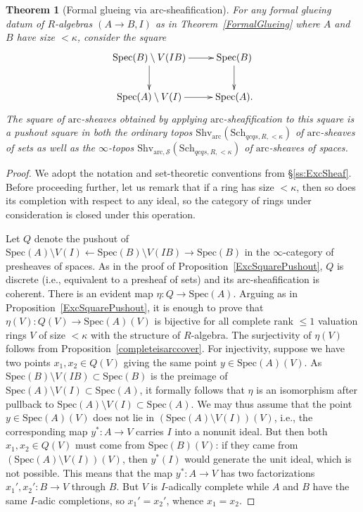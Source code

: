 \documentclass[reqno]{amsart}
\newcommand{\spec}{\mathrm{Spec}}
\newcommand{\arc}{\mathrm{arc}}
\newtheorem{theorem}{Theorem}[section]
\theoremstyle{definition}
\begin{document}
\begin{theorem}[Formal glueing via $\arc$-sheafification]
\label{FormalGlueArcSheaf}
For any formal glueing datum of $R$-algebras $(A \to B,I)$ as in Theorem~\ref{FormalGlueing} where $A$ and $B$ have size $< \kappa$, consider the square 
\[ \xymatrix{ \mathrm{Spec}(B) \setminus V(IB) \ar[r] \ar[d] & \mathrm{Spec}(B)
\ar[d] \\ \mathrm{Spec}(A) \setminus V(I) \ar[r] & \mathrm{Spec}(A). }\]
The square of $\arc$-sheaves obtained by applying $\arc$-sheafification to this
square is a pushout square in both the ordinary topos
$\mathrm{Shv}_{\arc}(\mathrm{Sch}_{qcqs,R, <\kappa})$ of $\arc$-sheaves of sets
as well as the $\infty$-topos
$\mathrm{Shv}_{\arc,\mathcal{S}}(\mathrm{Sch}_{qcqs,R, <\kappa})$ of $\arc$-sheaves of spaces.
\end{theorem}
\begin{proof}
We adopt the notation and set-theoretic conventions from \S \ref{ss:ExcSheaf}.  Before proceeding further, let us remark that if a ring has size $< \kappa$, then so does its completion with respect to any ideal, so the category of rings under consideration is closed under this operation.
 
Let $Q$ denote the pushout of $\spec(A) \setminus V(I) \gets \spec(B) \setminus
V(IB) \to \spec(B)$ in the $\infty$-category of presheaves of spaces. As in the
proof of Proposition~\ref{ExcSquarePushout}, $Q$ is discrete (i.e., equivalent
to a presheaf of sets) and its $\arc$-sheafification is coherent. There is an
evident map $\eta\colon Q \to \spec(A)$. Arguing as in
Proposition~\ref{ExcSquarePushout}, it is enough to prove that $\eta(V)\colon
Q(V) \to \spec(A)(V)$ is bijective for all complete rank $\leq 1$ valuation
rings $V$ of size $< \kappa$ with the structure of $R$-algebra. The surjectivity
of $\eta(V)$ follows from Proposition~\ref{completeisarccover}. For injectivity,
suppose we have two points $x_1,x_2 \in Q(V)$ giving the same point  $y \in \spec(A)(V)$. As $\spec(B) \setminus V(IB) \subset \spec(B)$ is the preimage of $\spec(A) \setminus V(I) \subset \spec(A)$, it formally follows that $\eta$ is an isomorphism after pullback to $\spec(A) \setminus V(I) \subset \spec(A)$. We may thus assume that the point $y \in \spec(A)(V)$ does not lie in $(\spec(A) \setminus V(I))(V)$, i.e., the corresponding map $y^*\colon A \to V$ carries $I$ into a nonunit ideal. But then both $x_1,x_2 \in Q(V)$ must come from $\spec(B)(V)$: if they came from $(\spec(A) \setminus V(I))(V)$, then $y^*(I)$ would generate the unit ideal, which is not possible. This means that the map $y^*\colon A \to V$ has two factorizations $x_1',x_2'\colon B \to V$ through $B$. But $V$ is $I$-adically complete  while $A$ and $B$ have the same $I$-adic completions, so $x_1' = x_2'$, whence $x_1 = x_2$.
\end{proof}
\end{document}
